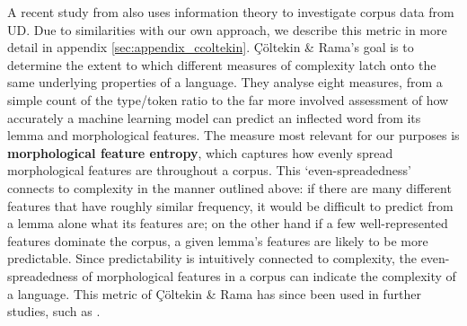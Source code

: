\documentclass[USenglish]{article}
\begin{document}
A recent study from \citet{ccoltekin2023complexity} also uses information theory to investigate corpus data from UD. 
Due to similarities with our own approach, we describe this metric in more detail in appendix \ref{sec:appendix_ccoltekin}.
Çöltekin \& Rama's goal is to determine the extent to which different measures of complexity latch onto the same underlying properties of a language. 
They analyse eight measures, from a simple count of the type/token ratio to the far more involved assessment of how accurately a machine learning model can predict an inflected word from its lemma and morphological features.
The measure most relevant for our purposes is \textbf{morphological feature entropy}, which captures how evenly spread morphological features are throughout a corpus.
This `even-spreadedness' connects to complexity in the manner outlined above: if there are many different features that have roughly similar frequency, it would be difficult to predict from a lemma alone what its features are; on the other hand if a few well-represented features dominate the corpus, a given lemma's features are likely to be more predictable.
Since predictability is intuitively connected to complexity, the even-spreadedness of morphological features in a corpus can indicate the complexity of a language.
This metric of Çöltekin \& Rama has since been used in further studies, such as \citet{bentz2023complexity}.

\end{document}
